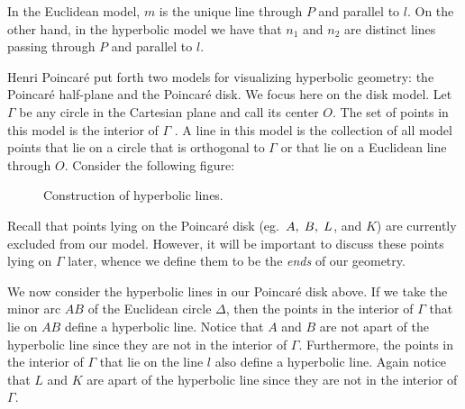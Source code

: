 \documentclass[12pt]{article}
\newcommand{\ttc}{, \hspace{1mm}}
\newcommand{\poincare}{Poincar\'{e} }
\theoremstyle{plain}
\theoremstyle{definition}
\begin{document}
In the Euclidean model, $m$ is the unique line through $P$ and parallel to $l$. On the other hand, in the hyperbolic model we have that $n_1$ and $n_2$ are distinct lines passing through $P$ and parallel to $l$. 

Henri \poincare put forth two models for visualizing hyperbolic geometry: the \poincare half-plane and the \poincare disk. We focus here on the disk model. Let $\Gamma$ be any circle in the Cartesian plane and call its center $O$. The set of points in this model is the interior of $\Gamma$ \cite{hartshorne}. A line in this model is the collection of all model points that lie on a circle that is orthogonal to $\Gamma$ or that lie on a Euclidean line through $O$. Consider the following figure:

\begin{figure}[h]
\begin{center}
\end{center}
	\label{fig:construction_hyperbolic_lines}
	\caption{Construction of hyperbolic lines.}
\end{figure}
	
Recall that points lying on the \poincare disk (eg.~$A\ttc B \ttc L$, and $K$) are currently excluded from our model. However, it will be important to discuss these points lying on $\Gamma$ later, whence we define them to be the \textit{ends} of our geometry. 

We now consider the hyperbolic lines in our \poincare disk above. If we take the minor arc $AB$ of the Euclidean circle $\Delta$, then the points in the interior of $\Gamma$ that lie on $AB$ define a hyperbolic line. Notice that $A$ and $B$ are not apart of the hyperbolic line since they are not in the interior of $\Gamma$. Furthermore, the points in the interior of $\Gamma$ that lie on the line $l$ also define a hyperbolic line. Again notice that $L$ and $K$ are apart of the hyperbolic line since they are not in the interior of $\Gamma$. 
\end{document}
